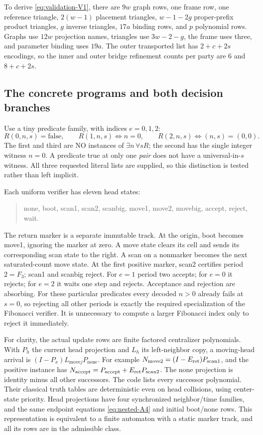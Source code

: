 To derive \eqref{eq:validation-V1}, there are $9w$ graph rows, one frame row, one reference
triangle, $2(w-1)$ placement triangles, $w-1-2g$ proper-prefix product
triangles, $g$ inverse triangles, $17a$ binding rows, and $p$ polynomial
rows. Graphs use $12w$ projection names, triangles use $3w-2-g$, the
frame uses three, and parameter binding uses $19a$. The outer
transported list has $2+c+2s$ encodings, so the inner and outer bridge
refinement counts per party are $6$ and $8+c+2s$.

\subsection{The concrete programs and both decision branches}
Use a tiny predicate family, with indices $e=0,1,2$:
\begin{equation}
 R(0,n,s)=\mathrm{false},\qquad R(1,n,s)\iff n=0,\qquad
 R(2,n,s)\iff (n,s)=(0,0).                                  \label{eq:validation-V2}
\end{equation}
The first and third are NO instances of $\exists n\,\forall sR$;
the second has the single integer witness $n=0$. A predicate true at
only one \emph{pair} does not have a universal-in-$s$ witness. All
three requested literal lists are supplied, so this distinction is
tested rather than left implicit.

Each uniform verifier has eleven head states:
\begin{quote}\small
none, boot, scan1, scan2, scanbig, move1, move2, movebig,
accept, reject, wait.
\end{quote}
The return marker is a separate immutable track. At the origin, boot
becomes move1, ignoring the marker at zero. A move state clears its
cell and sends its corresponding scan state to the right. A scan on
a nonmarker becomes the next saturated-count move state. At the first
positive marker, scan2 certifies period $2=F_3$; scan1 and scanbig
reject. For $e=1$ period two accepts; for $e=0$ it rejects; for $e=2$
it waits one step and rejects. Acceptance and rejection are absorbing.
For these particular predicates every decoded $n>0$ already fails
at $s=0$, so rejecting all other periods is exactly the required
specialization of the Fibonacci verifier. It is unnecessary to
compute a larger Fibonacci index only to reject it immediately.

For clarity, the actual update rows are finite factored centralizer
polynomials. With $P_h$ the current head projection and $L_h$ its
left-neighbor copy, a moving-head arrival is
$(I-P_x)L_{\mathrm{move}j}P_{\mathrm{none}}$.
For example $N_{\mathrm{move2}}=(I-E_{\rm ret})P_{\mathrm{scan1}}$,
and the positive instance has
$N_{\rm accept}=P_{\rm accept}+E_{\rm ret}P_{\rm scan2}$.
The none projection is identity minus all other successors. The code
lists every successor polynomial. Their classical truth tables are
deterministic even on head collisions, using center-state priority.
Head projections have four synchronized neighbor/time families, and
the same endpoint equations \eqref{eq:nested-A4} and initial boot/none rows.
This representation is equivalent to a finite automaton with a
static marker track, and all its rows are in the admissible class.

